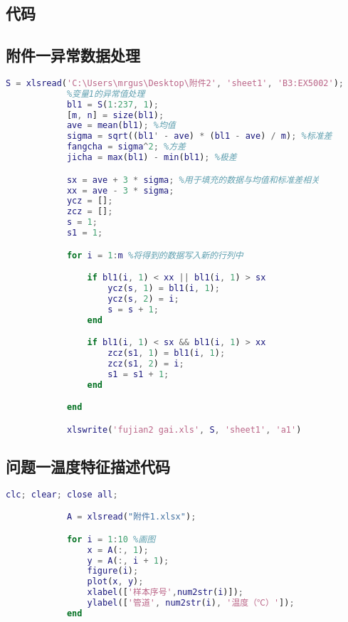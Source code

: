 \begin{appendices}
    \section{代码}
    \subsection{附件一异常数据处理}
        \begin{lstlisting}[language=matlab]
            S = xlsread('C:\Users\mrgus\Desktop\附件2', 'sheet1', 'B3:EX5002');
            %变量1的异常值处理
            bl1 = S(1:237, 1);
            [m, n] = size(bl1);
            ave = mean(bl1); %均值
            sigma = sqrt((bl1' - ave) * (bl1 - ave) / m); %标准差
            fangcha = sigma^2; %方差
            jicha = max(bl1) - min(bl1); %极差

            sx = ave + 3 * sigma; %用于填充的数据与均值和标准差相关
            xx = ave - 3 * sigma;
            ycz = [];
            zcz = [];
            s = 1;
            s1 = 1;

            for i = 1:m %将得到的数据写入新的行列中

                if bl1(i, 1) < xx || bl1(i, 1) > sx
                    ycz(s, 1) = bl1(i, 1);
                    ycz(s, 2) = i;
                    s = s + 1;
                end

                if bl1(i, 1) < sx && bl1(i, 1) > xx
                    zcz(s1, 1) = bl1(i, 1);
                    zcz(s1, 2) = i;
                    s1 = s1 + 1;
                end

            end

            xlswrite('fujian2 gai.xls', S, 'sheet1', 'a1')

        \end{lstlisting}

    \subsection{问题一温度特征描述代码}
        \begin{lstlisting}[language=matlab]
            clc; clear; close all;

            A = xlsread("附件1.xlsx");

            for i = 1:10 %画图
                x = A(:, 1);
                y = A(:, i + 1);
                figure(i);
                plot(x, y);
                xlabel(['样本序号',num2str(i)]);
                ylabel(['管道', num2str(i), '温度（℃）']);
            end


\end{lstlisting}
\end{appendices}
